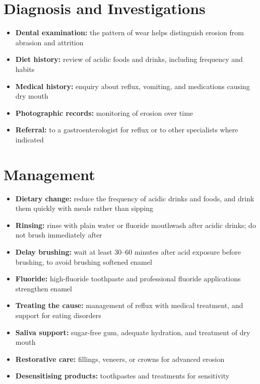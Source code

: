\section*{Diagnosis and Investigations}
\begin{itemize}
    \item \textbf{Dental examination:} the pattern of wear helps distinguish erosion from abrasion and attrition
    \item \textbf{Diet history:} review of acidic foods and drinks, including frequency and habits
    \item \textbf{Medical history:} enquiry about reflux, vomiting, and medications causing dry mouth
    \item \textbf{Photographic records:} monitoring of erosion over time
    \item \textbf{Referral:} to a gastroenterologist for reflux or to other specialists where indicated
\end{itemize}

\section*{Management}
\begin{itemize}
    \item \textbf{Dietary change:} reduce the frequency of acidic drinks and foods, and drink them quickly with meals rather than sipping
    \item \textbf{Rinsing:} rinse with plain water or fluoride mouthwash after acidic drinks; do not brush immediately after
    \item \textbf{Delay brushing:} wait at least 30--60 minutes after acid exposure before brushing, to avoid brushing softened enamel
    \item \textbf{Fluoride:} high-fluoride toothpaste and professional fluoride applications strengthen enamel
    \item \textbf{Treating the cause:} management of reflux with medical treatment, and support for eating disorders
    \item \textbf{Saliva support:} sugar-free gum, adequate hydration, and treatment of dry mouth
    \item \textbf{Restorative care:} fillings, veneers, or crowns for advanced erosion
    \item \textbf{Desensitising products:} toothpastes and treatments for sensitivity
\end{itemize}

